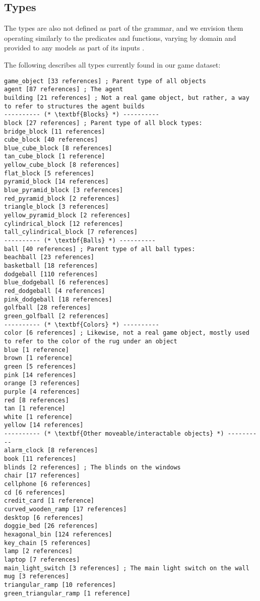 \documentclass{article}
\begin{document}
\subsection{Types} \label{sec:types}
The types are also not defined as part of the grammar, and we envision them operating similarly to the predicates and functions, varying by domain and provided to any models as part of its inputs .

The following describes all types currently found in our game dataset:

\begin{lstlisting}
game_object [33 references] ; Parent type of all objects
agent [87 references] ; The agent
building [21 references] ; Not a real game object, but rather, a way to refer to structures the agent builds
---------- (* \textbf{Blocks} *) ----------
block [27 references] ; Parent type of all block types:
bridge_block [11 references]
cube_block [40 references]
blue_cube_block [8 references]
tan_cube_block [1 reference]
yellow_cube_block [8 references]
flat_block [5 references]
pyramid_block [14 references]
blue_pyramid_block [3 references]
red_pyramid_block [2 references]
triangle_block [3 references]
yellow_pyramid_block [2 references]
cylindrical_block [12 references]
tall_cylindrical_block [7 references]
---------- (* \textbf{Balls} *) ----------
ball [40 references] ; Parent type of all ball types:
beachball [23 references]
basketball [18 references]
dodgeball [110 references]
blue_dodgeball [6 references]
red_dodgeball [4 references]
pink_dodgeball [18 references]
golfball [28 references]
green_golfball [2 references]
---------- (* \textbf{Colors} *) ----------
color [6 references] ; Likewise, not a real game object, mostly used to refer to the color of the rug under an object
blue [1 reference]
brown [1 reference]
green [5 references]
pink [14 references]
orange [3 references]
purple [4 references]
red [8 references]
tan [1 reference]
white [1 reference]
yellow [14 references]
---------- (* \textbf{Other moveable/interactable objects} *) ----------
alarm_clock [8 references]
book [11 references]
blinds [2 references] ; The blinds on the windows
chair [17 references]
cellphone [6 references]
cd [6 references]
credit_card [1 reference]
curved_wooden_ramp [17 references]
desktop [6 references]
doggie_bed [26 references]
hexagonal_bin [124 references]
key_chain [5 references]
lamp [2 references]
laptop [7 references]
main_light_switch [3 references] ; The main light switch on the wall
mug [3 references]
triangular_ramp [10 references]
green_triangular_ramp [1 reference]

\end{lstlisting}
\end{document}

